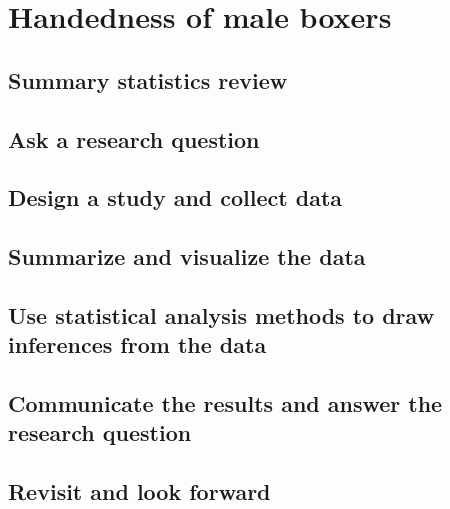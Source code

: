 \documentclass[
]{report}
\begin{document}
\hypertarget{handedness-of-male-boxers-1}{%
\section{Handedness of male boxers}\label{handedness-of-male-boxers-1}}

\hypertarget{summary-statistics-review}{%
\subsection{Summary statistics review}\label{summary-statistics-review}}

\hypertarget{ask-a-research-question}{%
\subsection{Ask a research question}\label{ask-a-research-question}}

\hypertarget{design-a-study-and-collect-data}{%
\subsection{Design a study and collect data}\label{design-a-study-and-collect-data}}

\hypertarget{summarize-and-visualize-the-data}{%
\subsection{Summarize and visualize the data}\label{summarize-and-visualize-the-data}}

\hypertarget{use-statistical-analysis-methods-to-draw-inferences-from-the-data}{%
\subsection{Use statistical analysis methods to draw inferences from the data}\label{use-statistical-analysis-methods-to-draw-inferences-from-the-data}}

\hypertarget{communicate-the-results-and-answer-the-research-question}{%
\subsection{Communicate the results and answer the research question}\label{communicate-the-results-and-answer-the-research-question}}

\hypertarget{revisit-and-look-forward}{%
\subsection{Revisit and look forward}\label{revisit-and-look-forward}}
\end{document}
